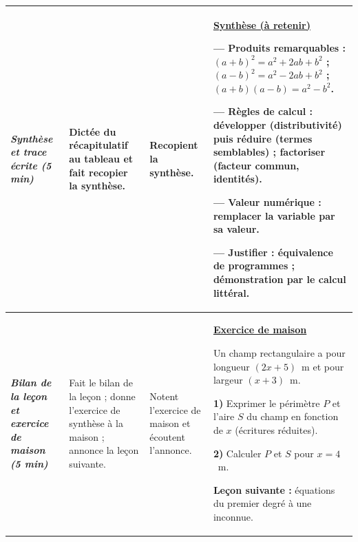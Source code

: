 \documentclass[10pt]{article}
\newcommand{\titreR}[1]{\underline{\textcolor{rougetitre}{\bfseries #1}}}
\newcommand{\maison}{\underline{\textcolor{rougemaison}{\bfseries Exercice de maison}}}
\newcommand{\moment}[1]{\textbf{\itshape #1}}
\begin{document}
\begin{longtable}{|p{2.35cm}|p{5.35cm}|p{4.55cm}|p{13.85cm}|}
\moment{Synthèse et trace écrite (5 min)} &
Dictée du récapitulatif au tableau et fait recopier la synthèse. &
Recopient la synthèse. &
\titreR{Synthèse (à retenir)} \par
— \textbf{Produits remarquables} : $(a+b)^2=a^2+2ab+b^2$ ; \;
$(a-b)^2=a^2-2ab+b^2$ ; \; $(a+b)(a-b)=a^2-b^2$. \par
— \textbf{Règles de calcul} : développer (distributivité) puis réduire
(termes semblables) ; \textbf{factoriser} (facteur commun, identités). \par
— \textbf{Valeur numérique} : remplacer la variable par sa valeur. \par
— \textbf{Justifier} : équivalence de programmes ; démonstration par le calcul
littéral. \\ \hline

\moment{Bilan de la leçon et exercice de maison (5 min)} &
Fait le bilan de la leçon ; donne l'exercice de synthèse à la maison ; annonce la
leçon suivante. &
Notent l'exercice de maison et écoutent l'annonce. &
\maison \par
Un champ rectangulaire a pour longueur $(2x+5)$~m et pour largeur $(x+3)$~m. \par
\textbf{1)} Exprimer le périmètre $P$ et l'aire $S$ du champ en fonction de $x$
(écritures réduites). \par
\textbf{2)} Calculer $P$ et $S$ pour $x=4$~m. \par
\textbf{Leçon suivante :} équations du premier degré à une inconnue. \\ \hline
\end{longtable}
\end{document}
